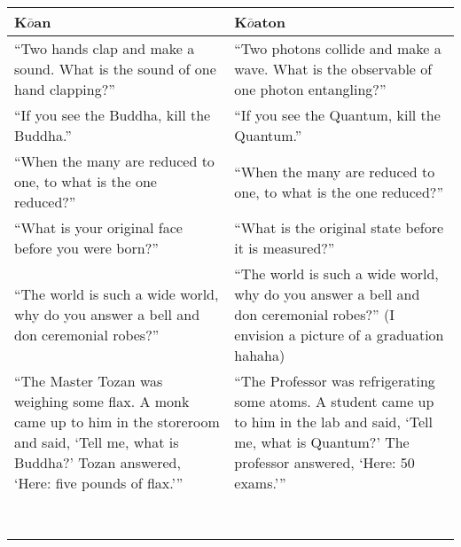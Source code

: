 \documentclass{article}
\begin{document}
	\hspace{-2.5cm}
	\begin{tabular}{|p{7.5cm}|p{7.5cm}|}
		\hline
		\textbf{K$\bar{o}$an} & \textbf{K$\bar{o}$aton}\\ \hline
		``Two hands clap and make a sound. What is the sound of one hand clapping?'' & ``Two photons collide and make a wave. What is the observable of one photon entangling?''\\ \hline
		``If you see the Buddha, kill the Buddha.'' & ``If you see the Quantum, kill the Quantum.'' \\ \hline
		``When the many are reduced to one, to what is the one reduced?'' & ``When the many are reduced to one, to what is the one reduced?''\\ \hline
		``What is your original face before you were born?'' & ``What is the original state before it is measured?''\\ \hline
		``The world is such a wide world, why do you answer a bell and don ceremonial robes?'' & ``The world is such a wide world, why do you answer a bell and don ceremonial robes?'' (I envision a picture of a graduation hahaha)\\ \hline
		``The Master Tozan was weighing some flax. A monk came up to him in the storeroom and said, `Tell me, what is Buddha?' Tozan answered, `Here: five pounds of flax.''' & ``The Professor was refrigerating some atoms. A student came up to him in the lab and said, `Tell me, what is Quantum?' The professor answered, `Here: 50 exams.'''\\ \hline
		& \\ \hline
		& \\ \hline
		& \\ \hline
		& \\ \hline
		& \\ \hline
		& \\ \hline
		& \\ \hline
		& \\ \hline
	\end{tabular}
\end{document}
